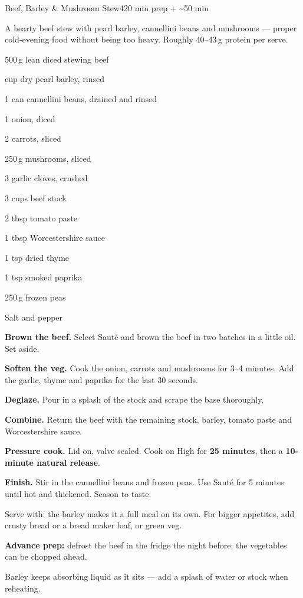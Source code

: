 \begin{recipebox}{Beef, Barley \& Mushroom Stew}{4}{20 min prep + \textasciitilde50 min}

A hearty beef stew with pearl barley, cannellini beans and mushrooms --- proper
cold-evening food without being too heavy. Roughly 40--43\,g protein per serve.

\begin{ingredients}
  \item 500\,g lean diced stewing beef
  \item {} cup dry pearl barley, rinsed
  \item 1 can cannellini beans, drained and rinsed
  \item 1 onion, diced
  \item 2 carrots, sliced
  \item 250\,g mushrooms, sliced
  \item 3 garlic cloves, crushed
  \item 3 cups beef stock
  \item 2 tbsp tomato paste
  \item 1 tbsp Worcestershire sauce
  \item 1 tsp dried thyme
  \item 1 tsp smoked paprika
  \item 250\,g frozen peas
  \item Salt and pepper
\end{ingredients}

\begin{method}
  \item \textbf{Brown the beef.} Select Saut\'e and brown the beef in two batches in a little oil. Set aside.
  \item \textbf{Soften the veg.} Cook the onion, carrots and mushrooms for 3--4 minutes. Add the garlic, thyme and paprika for the last 30 seconds.
  \item \textbf{Deglaze.} Pour in a splash of the stock and scrape the base thoroughly.
  \item \textbf{Combine.} Return the beef with the remaining stock, barley, tomato paste and Worcestershire sauce.
  \item \textbf{Pressure cook.} Lid on, valve sealed. Cook on High for \textbf{25 minutes}, then a \textbf{10-minute natural release}.
  \item \textbf{Finish.} Stir in the cannellini beans and frozen peas. Use Saut\'e for 5 minutes until hot and thickened. Season to taste.
\end{method}

\begin{notelist}
  \item Serve with: the barley makes it a full meal on its own. For bigger
        appetites, add crusty bread or a bread maker loaf, or green veg.
  \item \textbf{Advance prep:} defrost the beef in the fridge the night before; the vegetables can be chopped ahead.
  \item Barley keeps absorbing liquid as it sits --- add a splash of water or stock when reheating.
\end{notelist}

\end{recipebox}
